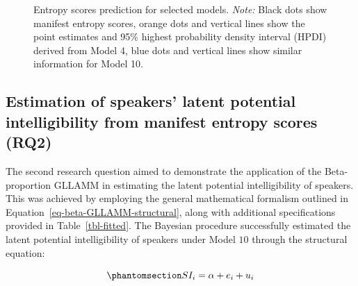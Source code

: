 \documentclass[
sn-apacite
]{sn-jnl}
\begin{document}
\label{cell-fig-rq1-pred-speaker}
\begin{figure}[H]


\caption{\label{fig-rq1-pred-speaker}Entropy scores prediction for
selected models. \emph{Note:} Black dots show manifest entropy scores,
orange dots and vertical lines show the point estimates and 95\% highest
probability density interval (HPDI) derived from Model 4, blue dots and
vertical lines show similar information for Model 10.}

\end{figure}%

\subsection{Estimation of speakers' latent potential intelligibility
from manifest entropy scores (RQ2)}\label{sec-R-RQ2}

The second research question aimed to demonstrate the application of the
Beta-proportion GLLAMM in estimating the latent potential
intelligibility of speakers. This was achieved by employing the general
mathematical formalism outlined in
Equation~\ref{eq-beta-GLLAMM-structural}, along with additional
specifications provided in Table~\ref{tbl-fitted}. The Bayesian
procedure successfully estimated the latent potential intelligibility of
speakers under Model \(10\) through the structural equation:

\begin{equation}\phantomsection\label{eq-beta-GLLAMM-structural-model10}{
SI_{i} = \alpha + e_{i} + u_{i}
}\end{equation}
\end{document}
